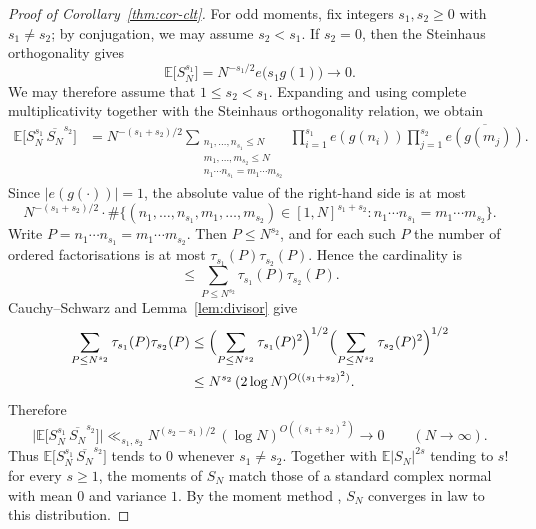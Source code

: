 \begin{proof}[Proof of Corollary~\ref{thm:cor-clt}]
For odd moments, fix integers $s_1,s_2\geq 0$ with $s_1\neq s_2$; by conjugation, we may assume $s_2<s_1$.  If $s_2=0$, then the Steinhaus orthogonality gives
\[
\mathbb{E}\bigl[S_N^{s_1}\bigr]
=N^{-s_1/2}e\bigl(s_1g(1)\bigr)\to 0.
\]
We may therefore assume that $1\leq s_2<s_1$.  Expanding and using complete multiplicativity together with the Steinhaus orthogonality relation, we obtain
\begin{align*}
\mathbb{E}\bigl[S_N^{s_1}\,\overline{S_N}^{s_2}\bigr]
&=N^{-(s_1+s_2)/2}
\sum_{\substack{n_1,\ldots,n_{s_1}\leq N\\ m_1,\ldots,m_{s_2}\leq N\\ n_1\cdots n_{s_1}=m_1\cdots m_{s_2}}}
\prod_{i=1}^{s_1}e(g(n_i))
\prod_{j=1}^{s_2}\overline{e(g(m_j))}.
\end{align*}
Since $|e(g(\cdot))|=1$, the absolute value of the right-hand side is at most
\[
N^{-(s_1+s_2)/2}
\cdot\#\bigl\{(n_1,\ldots,n_{s_1},m_1,\ldots,m_{s_2})\in[1,N]^{s_1+s_2}:
n_1\cdots n_{s_1}=m_1\cdots m_{s_2}\bigr\}.
\]
Write $P=n_1\cdots n_{s_1}=m_1\cdots m_{s_2}$.  Then $P\leq N^{s_2}$, and for each such $P$ the number of ordered factorisations is at most $\tau_{s_1}(P)\tau_{s_2}(P)$.  Hence the cardinality is
\[
\leq\sum_{P\leq N^{s_2}}\tau_{s_1}(P)\tau_{s_2}(P).
\]
Cauchy--Schwarz and Lemma~\ref{lem:divisor} give
\begin{align*}
\sum_{P\leq N^{s_2}}\tau_{s_1}(P)\tau_{s_2}(P)
&\leq\Bigl(\sum_{P\leq N^{s_2}}\tau_{s_1}(P)^2\Bigr)^{1/2}
\Bigl(\sum_{P\leq N^{s_2}}\tau_{s_2}(P)^2\Bigr)^{1/2}\\
&\leq N^{s_2}\,(2\log N)^{O((s_1+s_2)^2)}.
\end{align*}
Therefore
\[
\bigl|\mathbb{E}\bigl[S_N^{s_1}\,\overline{S_N}^{s_2}\bigr]\bigr|
\ll_{s_1,s_2} N^{(s_2-s_1)/2}\,(\log N)^{O((s_1+s_2)^2)}
\to 0
\qquad(N\to\infty).
\]
Thus \(\mathbb{E}\bigl[S_N^{s_1}\,\overline{S_N}^{s_2}\bigr]\) tends to \(0\) whenever \(s_1\neq s_2\). Together with \(\mathbb{E}|S_N|^{2s}\) tending to \(s!\) for every \(s\geq 1\), the moments of \(S_N\) match those of a standard complex normal with mean \(0\) and variance \(1\). By the moment method \cite[Chapter~5, Theorem~8.6]{Gut05}, \(S_N\) converges in law to this distribution.
\end{proof}
